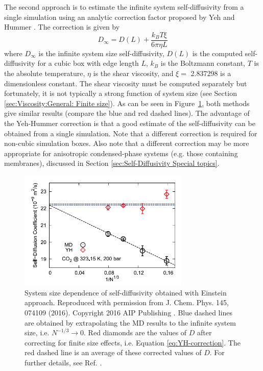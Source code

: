 \documentclass[9pt,bestpractices]{livecoms}
\begin{document}
The second approach is to estimate the infinite system self-diffusivity from a single simulation using an analytic correction factor proposed by Yeh and Hummer \cite{Yeh2004}. The correction is given by
\begin{equation}
	D_{\infty} = D(L) + \frac{k_B T \xi}{6 \pi \eta L}
	\label{eq:YH-correction}
\end{equation}
where $D_\infty$ is the infinite system size self-diffusivity, $D(L)$ is the computed self-diffusivity for a cubic box with edge length $L$, $k_B$ is the Boltzmann constant,
$T$ is the absolute temperature, $\eta$ is the shear viscosity, and $\xi =$ 2.837298 is a dimensionless constant. The shear viscosity must be computed separately but fortunately, it is not typically a strong function of system size (see Section \ref{sec:Viscosity:General: Finite size}). As can be seen in Figure~\ref{fig:MoultosFig1}, both methods give similar results (compare the blue and red dashed lines). The advantage of the Yeh-Hummer correction is that a good estimate of the self-diffusivity can be obtained from a single simulation. Note that a different correction is required for non-cubic simulation boxes.\cite{Kikugawa:2015} Also note that a different correction may be more appropriate for anisotropic condensed-phase systems (e.g. those containing membranes), discussed in Section \ref{sec:Self-Diffusivity Special topics}.

\begin{figure}[htb!]
	\centering
	\includegraphics[width=3.2in]{MoultosFig1.png}
	\caption{System size dependence of self-diffusivity obtained with Einstein approach. Reproduced with permission from J. Chem. Phys. 145, 074109 (2016). Copyright 2016 AIP Publishing \cite{Moultos2016}. Blue dashed lines are obtained by extrapolating the MD results to the infinite system size, i.e. $N^{-1/3} \to 0$. Red diamonds are the values of $D$ after correcting for finite size effects, i.e. Equation \ref{eq:YH-correction}. The red dashed line is an average of these corrected values of $D$. For further details, see Ref. \cite{Moultos2016}.}
	\label{fig:MoultosFig1}
\end{figure}
\end{document}
